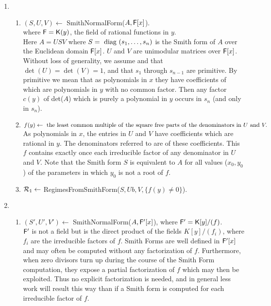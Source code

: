 \begin{enumerate}
\item
\begin{enumerate}
\item
$(S, U, V) \leftarrow $ SmithNormalForm($A, {\mathsf F}[x]$).\\[0.2cm]
where ${\mathsf F} = {\mathsf K}(y)$, the field of rational functions in $y$.\\ 
\bc
Here $A=USV$ where $S = ~\mbox{diag}~(s_1, \ldots, s_n)$ is the Smith form of $A$ over the Euclidean domain ${\mathsf F}[x]$.
$U$ and $V$ are unimodular matrices over ${\mathsf F}[x]$.  Without loss of generality, we assume and that 
$\det(U) = \det(V) = 1$, 
and that $s_1$ through $s_{n-1}$ 
are primitive.  By primitive we mean that as polynomials in $x$ they have coefficients of which are polynomials in $y$ with no common
factor.  Then any factor $c(y)$ of det($A$) which is purely a polynomial in $y$ occurs in $s_n$
(and only in $s_n$).
\ec
\item
$f(y) \leftarrow {\rm ~the~least~common~multiple~of~the~square~free~parts~of~the~denominators~in~}
U ~\mbox{and}~ V.$\\[0.2cm]
\bc As polynomials in $x$, the entries in $U$ and $V$ have coefficients which
are rational in $y$.  The denominators referred to are of these coefficients. 
This $f$ contains exactly once each irreducible factor of any denominator in $U$ and $V$. Note that 
the Smith form $S$ is equivalent to $A$ for all values ($x_0, y_0$) of the parameters in which $y_0$ is not a root of $f$. \ec

\item 
${\cal R}_1 \leftarrow$ RegimesFromSmithForm($S, Ub, V, \{f(y) \neq 0\}$).
\end{enumerate}

\item
\begin{enumerate}
\item
$(S', U', V') \leftarrow $ SmithNormalForm($A, {\mathsf F}'[x]$),
where ${\mathsf F}' = {\mathsf K}[y]/(f)$.\\[0.2cm]
\bc ${\mathsf F}'$ is not a field but is the direct product of the fields $K[y]/(f_i)$, 
where $f_i$ are the irreducible factors of $f$.  Smith Forms are well defined in ${\mathsf F}'[x]$ and may often
be computed without any factorization of $f$.  Furthermore, when zero divisors turn up during the course of the
Smith Form computation, they expose a partial factorization of $f$ which may then be exploited.  Thus no explicit
factorization is needed, and in general less work will result this way than if a Smith form is computed for each 
irreducible factor of $f$. \ec


\end{enumerate}
\end{enumerate}

